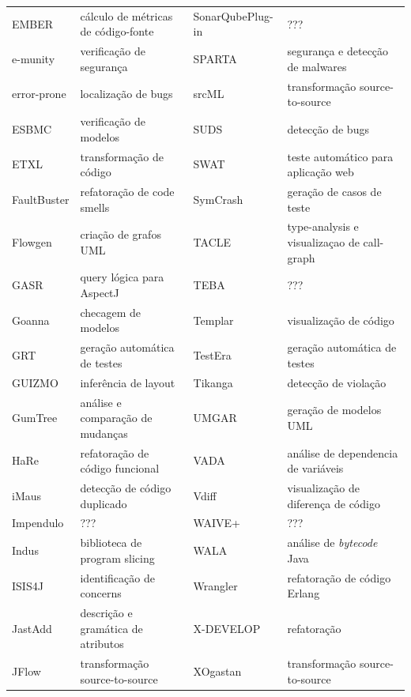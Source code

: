 \begin{table}[h]
{\begin{tabular}{| l | l | l | l |}
  EMBER          & cálculo de métricas de código-fonte  & SonarQubePlug-in & ???                                  \\
  e-munity       & verificação de segurança             & SPARTA           & segurança e detecção de malwares     \\
  error-prone    & localização de bugs                  & srcML            & transformação source-to-source       \\
  ESBMC          & verificação de modelos               & SUDS             & detecção de bugs                     \\
  ETXL           & transformação de código              & SWAT             & teste automático para aplicação web  \\
  FaultBuster    & refatoração de code smells           & SymCrash         & geração de casos de teste            \\
  Flowgen        & criação de grafos UML                & TACLE            & type-analysis e visualizaçao de call-graph \\
  GASR           & query lógica para AspectJ            & TEBA             & ???                                  \\
  Goanna         & checagem de modelos                  & Templar          & visualização de código               \\
  GRT            & geração automática de testes         & TestEra          & geração automática de testes         \\
  GUIZMO         & inferência de layout                 & Tikanga          & detecção de violação                 \\
  GumTree        & análise e comparação de mudanças     & UMGAR            & geração de modelos UML               \\
  HaRe           & refatoração de código funcional      & VADA             & análise de dependencia de variáveis  \\
  iMaus          & detecção de código duplicado         & Vdiff            & visualização de diferença de código  \\
  Impendulo      & ???                                  & WAIVE+           & ???                                  \\
  Indus          & biblioteca de program slicing        & WALA             & análise de {\it bytecode} Java       \\
  ISIS4J         & identificação de concerns            & Wrangler         & refatoração de código Erlang         \\
  JastAdd        & descrição e gramática de atributos   & X-DEVELOP        & refatoração                          \\
  JFlow          & transformação source-to-source       & XOgastan         & transformação source-to-source       \\
  \hline
\end{tabular}
\label{resumo-de-ferramentas}
}
\end{table}


